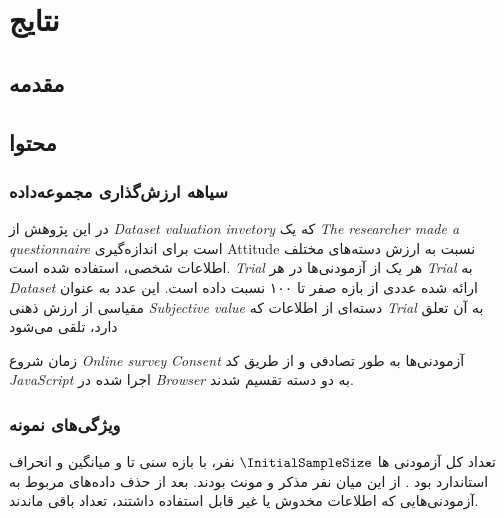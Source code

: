\chapter{نتایج}
\label{chap:results}
\section{مقدمه}

\section{محتوا}
\subsection{سیاهه ارزش‌گذاری مجموعه‌داده}

در این پژوهش از
{\textit{\gls{Dataset valuation invetory}}}
که یک
{\textit{\gls{The researcher made a questionnaire}}}
است برای اندازه‌گیری
\gls{Attitude}
نسبت به ارزش دسته‌های مختلف اطلاعات شخصی، استفاده شده است.
\textit{\gls{Trial}}
هر یک از آزمودنی‌ها در هر
\textit{\gls{Trial}}
به
\textit{\gls{Dataset}}
ارائه شده عددی از بازه صفر تا ۱۰۰ نسبت داده است. این عدد به عنوان مقیاسی از ارزش ذهنی
\textit{\gls{Subjective value}}
دسته‌ای از اطلاعات که
\textit{\gls{Trial}}
به آن تعلق دارد، تلقی می‌شود

زمان شروع
\textit{\gls{Online survey}}
\textit{\gls{Consent}}
آزمودنی‌ها به طور تصادفی و از طریق کد
\textit{\gls{JavaScript}}
اجرا شده در
\textit{\gls{Browser}}
به دو دسته تقسیم شدند.
\subsection{ویژگی‌های نمونه}
تعداد کل آزمودنی ها
$\InitialSampleSize$
نفر،
با بازه سنی
\ageMin
تا
\ageMax
و 
میانگین
\sampleAgeMean
و انحراف استاندارد
\sampleAgeSD
بود
\!. 
از این میان 
\SampleSizeMale
نفر مذکر و 
\SampleSizeFemale
مونث بودند.
بعد از حذف داده‌های مربوط به آزمودنی‌هایی که اطلاعات مخدوش یا غیر قابل استفاده داشتند، تعداد
\CleanedSampleSize
باقی ماندند.

